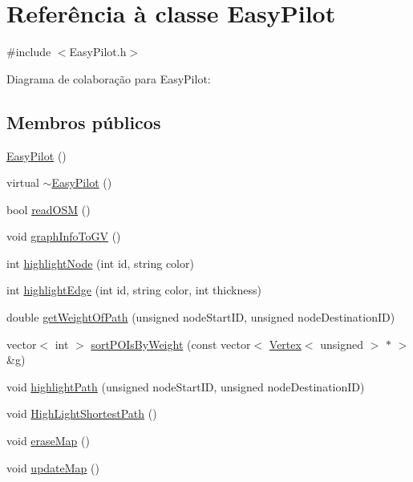 \hypertarget{class_easy_pilot}{}\section{Referência à classe Easy\+Pilot}
\label{class_easy_pilot}


{\ttfamily \#include $<$Easy\+Pilot.\+h$>$}



Diagrama de colaboração para Easy\+Pilot\+:
\subsection*{Membros públicos}
\begin{DoxyCompactItemize}
\item 
\hyperlink{class_easy_pilot_a724cc31f52fb07f5f86a3f71592ceed6}{Easy\+Pilot} ()
\item 
virtual \hyperlink{class_easy_pilot_af9dbdf328d32b3aa70de94f973335d6d}{$\sim$\+Easy\+Pilot} ()
\item 
bool \hyperlink{class_easy_pilot_a64817c638d599dc3b8d9c833a7ce33fc}{read\+O\+S\+M} ()
\item 
void \hyperlink{class_easy_pilot_a1390dbc215f3376a9954f89c52c3cc32}{graph\+Info\+To\+G\+V} ()
\item 
int \hyperlink{class_easy_pilot_a640864406bf361499e587764410c87e2}{highlight\+Node} (int id, string color)
\item 
int \hyperlink{class_easy_pilot_a1a020d88e153d05a4e68a258b420eaa3}{highlight\+Edge} (int id, string color, int thickness)
\item 
double \hyperlink{class_easy_pilot_a93f291c61c81fc5dbb46bfff63eb65ed}{get\+Weight\+Of\+Path} (unsigned node\+Start\+I\+D, unsigned node\+Destination\+I\+D)
\item 
vector$<$ int $>$ \hyperlink{class_easy_pilot_a457e255691b25063652a589b598e1ae5}{sort\+P\+O\+Is\+By\+Weight} (const vector$<$ \hyperlink{class_vertex}{Vertex}$<$ unsigned $>$ $\ast$ $>$ \&g)
\item 
void \hyperlink{class_easy_pilot_a4e992fbc635e8505a3b9596a017455d4}{highlight\+Path} (unsigned node\+Start\+I\+D, unsigned node\+Destination\+I\+D)
\item 
void \hyperlink{class_easy_pilot_a8470b9065378edc35c6ef71fff45affb}{High\+Light\+Shortest\+Path} ()
\item 
void \hyperlink{class_easy_pilot_ae885f727e3d2af5713f795a5b94d1472}{erase\+Map} ()
\item 
void \hyperlink{class_easy_pilot_a14b0155023bbf1318c2f033d3c015102}{update\+Map} ()

\end{DoxyCompactItemize}
